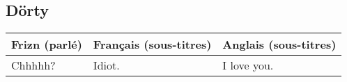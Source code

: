 \subsection*{Dörty}
\begin{tabular}{|p{2in}|p{2in}|p{2in}|}\hline
Frizn (parlé) & Français (sous-titres) & Anglais (sous-titres) \\\hline
Chhhhh? &
Idiot. &
I love you.\\\hline
\end{tabular}\par

{%
\parindent 0pt
\noindent
\ifx\preLilyPondExample \undefined
\else
  \expandafter\preLilyPondExample
\fi
\def\lilypondbook{}%

\ifx\postLilyPondExample \undefined
\else
  \expandafter\postLilyPondExample
\fi
}

%